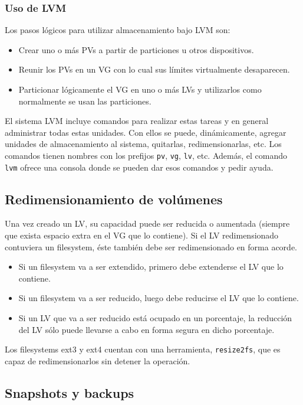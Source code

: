 \subsubsection {Uso de LVM}
Los pasos lógicos para utilizar almacenamiento bajo LVM son: 
\begin{itemize}
	\item Crear uno o más PVs a partir de particiones u otros dispositivos.
	\item Reunir los PVs en un VG con lo cual sus límites virtualmente desaparecen.
	\item Particionar lógicamente el VG en uno o más LVs y utilizarlos como normalmente se usan las particiones.
\end{itemize}

El sistema LVM incluye comandos para realizar estas tareas y en general administrar todas estas unidades. Con ellos se puede, dinámicamente, agregar unidades de almacenamiento al sistema, quitarlas, redimensionarlas, etc. Los comandos tienen nombres con los prefijos \lstinline$pv$, \lstinline$vg$, \lstinline$lv$, etc. Además, el comando \lstinline$lvm$ ofrece una consola donde se pueden dar esos comandos y pedir ayuda.

\subsection{Redimensionamiento de volúmenes}
\label{sub:redimVol}
Una vez creado un LV, su capacidad puede ser reducida o aumentada (siempre que exista espacio extra en el VG que lo contiene). 
Si el LV redimensionado contuviera un filesystem, éste también debe ser redimensionado en forma acorde. 
\begin{itemize}
	\item Si un filesystem va a ser extendido, primero debe extenderse el LV que lo contiene. 
	\item Si un filesystem va a ser reducido, luego debe reducirse el LV que lo contiene. 
	\item Si un LV que va a ser reducido está ocupado en un porcentaje, la reducción del LV sólo puede llevarse a cabo en forma segura en dicho porcentaje. 

\end{itemize}
Los filesystems ext3 y ext4 cuentan con una herramienta, \lstinline$resize2fs$, que es capaz de redimensionarlos sin detener la operación.

\subsection{Snapshots y backups}
\label{sub:snapshots}

